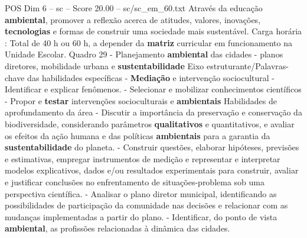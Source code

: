 \begin{textsample}{POS Dim 6 – sc – Score 20.00 – sc/sc\_em\_60.txt}
Através da educação \textbf{ambiental}, promover a reflexão acerca de atitudes, valores, inovações, \textbf{tecnologias} e formas de construir uma sociedade mais sustentável.
Carga horária : Total de 40 h ou 60 h, a depender da \textbf{matriz} curricular em funcionamento na Unidade Escolar.
Quadro 29 - Planejamento \textbf{ambiental} das cidades - planos diretores, mobilidade urbana e \textbf{sustentabilidade} Eixo estruturante/Palavras-chave das habilidades específicas - \textbf{Mediação} e intervenção sociocultural - Identificar e explicar fenômenos. - Selecionar e mobilizar conhecimentos científicos - Propor e \textbf{testar} intervenções socioculturais e \textbf{ambientais} Habilidades de aprofundamento da área - Discutir a importância da preservação e conservação da biodiversidade, considerando parâmetros \textbf{qualitativos} e quantitativos, e avaliar os efeitos da ação humana e das políticas \textbf{ambientais} para a garantia da \textbf{sustentabilidade} do planeta. - Construir questões, elaborar hipóteses, previsões e estimativas, empregar instrumentos de medição e representar e interpretar modelos explicativos, dados e/ou resultados experimentais para construir, avaliar e justificar conclusões no enfrentamento de situações-problema sob uma perspectiva científica. - Analisar o plano diretor municipal, identificando as possibilidades de participação da comunidade nas decisões e relacionar com as mudanças implementadas a partir do plano. - Identificar, do ponto de vista \textbf{ambiental}, as profissões relacionadas à dinâmica das cidades.

\end{textsample}
